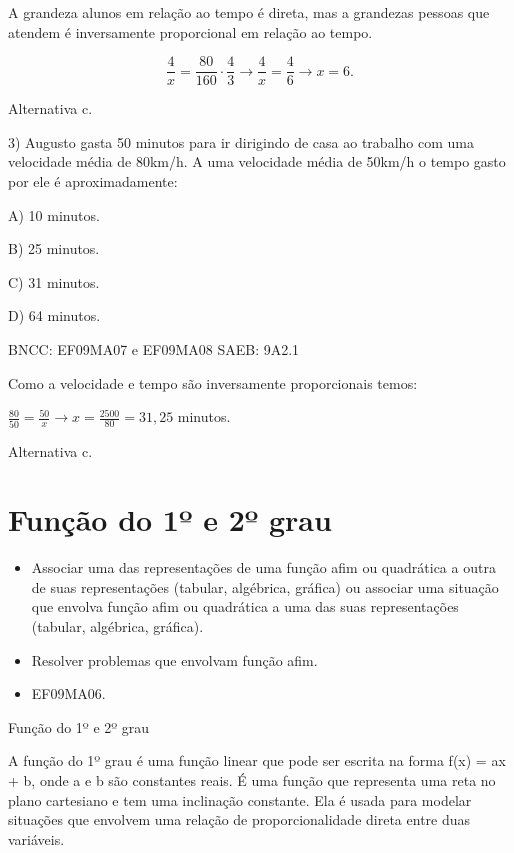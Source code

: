 \begin{escolha}
{{{\begin{escolha}
{A grandeza alunos em relação ao tempo é direta, mas a grandezas pessoas
que atendem é inversamente proporcional em relação ao tempo.

\[\frac{4}{x} = \frac{80}{160} \cdot \frac{4}{3} \rightarrow \frac{4}{x} = \frac{4}{6} \rightarrow x = 6.\]

Alternativa c.

3) Augusto gasta 50 minutos para ir dirigindo de casa ao trabalho com
uma velocidade média de 80km/h. A uma velocidade média de 50km/h o tempo
gasto por ele é aproximadamente:

A) 10 minutos.

B) 25 minutos.

C) 31 minutos.

D) 64 minutos.

BNCC: EF09MA07 e EF09MA08 SAEB: 9A2.1

Como a velocidade e tempo são inversamente proporcionais temos:

\(\frac{80}{50} = \frac{50}{x} \rightarrow x = \frac{2500}{80} = 31,25\)
minutos.

Alternativa c.

\pagestyle{mat}
\chapter{Função do 1º e 2º grau}


\begin{itemize}

  \item Associar uma das representações de uma função afim ou quadrática a
outra de suas representações (tabular, algébrica, gráfica) ou associar uma
situação que envolva função afim ou quadrática a uma das suas
representações (tabular, algébrica, gráfica).
  \item Resolver problemas que envolvam função afim.  

\end{itemize} 


\begin{itemize}
  \item EF09MA06.
\end{itemize}


Função do 1º e 2º grau


A função do 1º grau é uma função linear que pode ser escrita na forma
f(x) = ax + b, onde a e b são constantes reais. É uma função que
representa uma reta no plano cartesiano e tem uma inclinação constante.
Ela é usada para modelar situações que envolvem uma relação de
proporcionalidade direta entre duas variáveis.

}
\end{escolha}}}}
\end{escolha}
